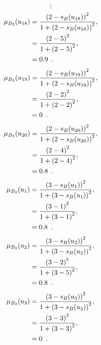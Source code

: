 \documentclass[a4paper,openany]{book}
\begin{document}
				\[
					\vdots
				\]\begin{align}
					\mu_{B_2}(u_{18}) &= \frac{\left(2-s_B(u_{18})\right)^2}{1 + \left(2-s_B(u_{18})\right)^2} ,\\
					&= \frac{\left(2-5\right)^2}{1 + \left(2-5\right)^2} \notag ,\\
					&= 0.9 \enspace. \notag
				\end{align}
				\begin{align}
					\mu_{B_2}(u_{19}) &= \frac{\left(2-s_B(u_{19})\right)^2}{1 + \left(2-s_B(u_{19})\right)^2} ,\\
					&= \frac{\left(2-2\right)^2}{1 + \left(2-2\right)^2} \notag ,\\
					&= 0 \enspace. \notag
				\end{align}
				\begin{align}
					\mu_{B_2}(u_{20}) &= \frac{\left(2-s_B(u_{20})\right)^2}{1 + \left(2-s_B(u_{20})\right)^2} ,\\
					&= \frac{\left(2-4\right)^2}{1 + \left(2-4\right)^2} \notag ,\\
					&= 0.8 \enspace. \notag
				\end{align}
				\begin{align}
					\mu_{B_3}(u_1) &= \frac{\left(3-s_B(u_1)\right)^2}{1 + \left(3-s_B(u_1)\right)^2} ,\\
					&= \frac{\left(3-1\right)^2}{1 + \left(3-1\right)^2} \notag ,\\
					&= 0.8 \enspace. \notag
				\end{align}
				\begin{align}
					\mu_{B_3}(u_2) &= \frac{\left(3-s_B(u_2)\right)^2}{1 + \left(3-s_B(u_2)\right)^2} ,\\
					&= \frac{\left(3-2\right)^5}{1 + \left(3-5\right)^2} \notag ,\\
					&= 0.8 \enspace. \notag
				\end{align}
				\begin{align}
					\mu_{B_3}(u_3) &= \frac{\left(3-s_B(u_3)\right)^2}{1 + \left(3-s_B(u_3)\right)^2} ,\\
					&= \frac{\left(3-3\right)^2}{1 + \left(3-3\right)^2} \notag ,\\
					&= 0 \enspace. \notag
				\end{align}
\end{document}
